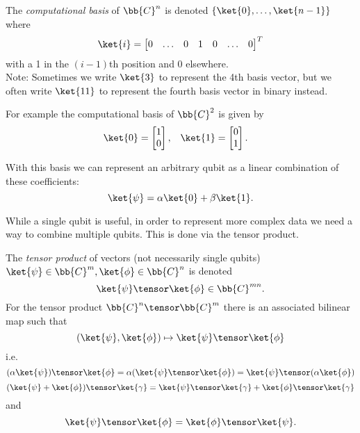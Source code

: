 \documentclass{article}
\begin{document}
        \begin{notation}
                The \textit{computational basis} of $\bb{C}^n$ is denoted $\{\ket{0}, \dots, \ket{n-1}\}$ where
                        $$\ket{i} = \begin{bmatrix} 0 & \dots & 0 & 1 & 0 & \dots & 0 \end{bmatrix}^T$$
                with a 1 in the $(i-1)$th position and 0 elsewhere.\\
                Note: Sometimes we write $\ket{3}$ to represent the 4th basis vector, but we often write $\ket{11}$ to represent the fourth basis vector in binary instead.
        \end{notation}
        For example the computational basis of $\bb{C}^2$ is given by
        \begin{align*}
        \ket{0} &= \begin{bmatrix} 1 \\ 0 \end{bmatrix}, & \ket{1} &= \begin{bmatrix} 0 \\ 1 \end{bmatrix}.
        \end{align*}

        With this basis we can represent an arbitrary qubit as a linear combination of these coefficients:
                $$\ket{\psi} = \alpha \ket{0} + \beta \ket{1}.$$

        While a single qubit is useful, in order to represent more complex data we need a way to combine multiple qubits.
        This is done via the tensor product.

        \begin{definition}
                The \textit{tensor product} of vectors (not necessarily single qubits) $\ket{\psi} \in \bb{C}^m, \ket{\phi} \in \bb{C}^n$ is denoted
                        $$\ket{\psi} \tensor \ket{\phi} \in \bb{C}^{mn}.$$
                For the tensor product $\bb{C}^n \tensor \bb{C}^m$ there is an associated bilinear map such that
                        $$(\ket{\psi}, \ket{\phi}) \mapsto \ket{\psi} \tensor \ket{\phi}$$
                i.e.
                $$(\alpha \ket{\psi}) \tensor \ket{\phi} = \alpha (\ket{\psi} \tensor \ket{\phi}) = \ket{\psi} \tensor (\alpha \ket{\phi})$$
                $$(\ket{\psi} + \ket{\phi}) \tensor \ket{\gamma} = \ket{\psi} \tensor \ket{\gamma} + \ket{\phi} \tensor \ket{\gamma}$$
                and
                $$\ket{\psi} \tensor \ket{\phi} = \ket{\phi} \tensor \ket{\psi}.$$
        \end{definition}
\end{document}
